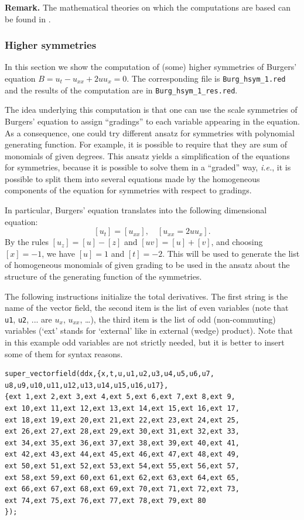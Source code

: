 \textbf{Remark.} The mathematical theories on which the computations are based
can be found in \cite{Krasilshchik:99,KerstenKrasilshchikVerboretsky:2004}.

\subsubsection{Higher symmetries}\label{sec:higher-symmetries}

In this section we show the computation of (some) higher symmetries of
Burgers' equation $B=u_t-u_{xx}+2uu_x=0$. The corresponding file is
\texttt{Burg\_hsym\_1.red} and the results of the computation are in
\texttt{Burg\_hsym\_1\_res.red}.

The idea underlying this computation is that one can use the scale symmetries
of Burgers' equation to assign ``gradings'' to each variable appearing in the
equation. As a consequence, one could try different ansatz for symmetries with
polynomial generating function. For example, it is possible to require that
they are sum of monomials of given degrees. This ansatz yields a simplification
of the equations for symmetries, because it is possible to solve them in a
``graded'' way, \emph{i.e.}, it is possible to split them into several
equations made by the homogeneous components of the equation for symmetries
with respect to gradings.

In particular, Burgers' equation translates into the following dimensional
equation:
\[
  [u_t]=[u_{xx}],\quad [u_{xx}=2uu_x].
\]
By the rules $[u_z]=[u]-[z]$ and $[uv]=[u]+[v]$, and choosing $[x]=-1$, we have
$[u]=1$ and $[t]=-2$. This will be used to generate the list of homogeneous
monomials of given grading to be used in the ansatz about the structure of the
generating function of the symmetries.

The following instructions initialize the total derivatives. The first string
is the name of the vector field, the second item is the list of even variables
(note that \texttt{u1}, \texttt{u2}, ... are $u_x$, $u_{xx}$, \dots), the third
item is the list of odd (non-commuting) variables (`ext' stands for `external'
like in external (wedge) product). Note that in this example odd variables are
not strictly needed, but it is better to insert some of them for syntax reasons.
\hypertarget{operator:SUPER_VECTORFIELD}{}
\begin{verbatim}
super_vectorfield(ddx,{x,t,u,u1,u2,u3,u4,u5,u6,u7,
u8,u9,u10,u11,u12,u13,u14,u15,u16,u17},
{ext 1,ext 2,ext 3,ext 4,ext 5,ext 6,ext 7,ext 8,ext 9,
ext 10,ext 11,ext 12,ext 13,ext 14,ext 15,ext 16,ext 17,
ext 18,ext 19,ext 20,ext 21,ext 22,ext 23,ext 24,ext 25,
ext 26,ext 27,ext 28,ext 29,ext 30,ext 31,ext 32,ext 33,
ext 34,ext 35,ext 36,ext 37,ext 38,ext 39,ext 40,ext 41,
ext 42,ext 43,ext 44,ext 45,ext 46,ext 47,ext 48,ext 49,
ext 50,ext 51,ext 52,ext 53,ext 54,ext 55,ext 56,ext 57,
ext 58,ext 59,ext 60,ext 61,ext 62,ext 63,ext 64,ext 65,
ext 66,ext 67,ext 68,ext 69,ext 70,ext 71,ext 72,ext 73,
ext 74,ext 75,ext 76,ext 77,ext 78,ext 79,ext 80
});
\end{verbatim}

